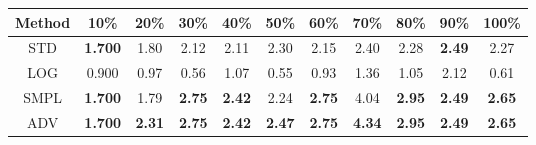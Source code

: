 \documentclass{standalone}
\begin{document}
\begin{tabular}{c|cccccccccc}
      \toprule
      Method & 10\% & 20\% & 30\% & 40\% & 50\% & 60\% & 70\% & 80\% & 90\% & 100\% \\
      \midrule
STD & \textbf{1.700} & 1.80 & 2.12 & 2.11 & 2.30 & 2.15 & 2.40 & 2.28 & \textbf{2.49} & 2.27\\
LOG & 0.900 & 0.97 & 0.56 & 1.07 & 0.55 & 0.93 & 1.36 & 1.05 & 2.12 & 0.61\\
SMPL & \textbf{1.700} & 1.79 & \textbf{2.75} & \textbf{2.42} & 2.24 & \textbf{2.75} & 4.04 & \textbf{2.95} & \textbf{2.49} & \textbf{2.65}\\
ADV & \textbf{1.700} & \textbf{2.31} & \textbf{2.75} & \textbf{2.42} & \textbf{2.47} & \textbf{2.75} & \textbf{4.34} & \textbf{2.95} & \textbf{2.49} & \textbf{2.65}\\
  \bottomrule
\end{tabular}
\end{document}
